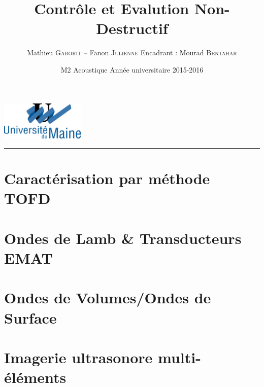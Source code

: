 \documentclass[a4paper, 10pt, twocolumn]{report}
\title{Contrôle et Evalution Non-Destructif}
\author{Mathieu \textsc{Gaborit} -- Fanon \textsc{Julienne} \hfill Encadrant : Mourad \textsc{Bentahar}}
\date{M2 Acoustique
    \vskip 1cm
    Année universitaire 2015-2016}
\makeatletter
\def\thetitle{\@title}
\def\theauthor{\@author}
\def\thedate{\@date}
\makeatother
\begin{document}
\begin{titlepage}

\begin{flushright}
\includegraphics[width=4cm]{logo.png}
\end{flushright}


\vskip 6cm


\vfill

\begin{center}
\Large{
\thedate
}
\end{center}

\vskip 1cm
\hrule height .5pt
\vskip 1cm

\begin{flushleft}
\theauthor
\end{flushleft}

\end{titlepage}


\renewcommand{\contentsname}{Sommaire
\vskip .5cm
\hrule height .5pt}
\tableofcontents

\newpage

\onecolumn


\twocolumn
\newpage
\part{Caractérisation par méthode TOFD}
\setcounter{section}{0}


\part{Ondes de Lamb \& Transducteurs EMAT}
\setcounter{section}{0}


\part{Ondes de Volumes/Ondes de Surface}
\setcounter{section}{0}


\part{Imagerie ultrasonore multi-éléments}
\setcounter{section}{0}



\newpage
\printbibliography

%
\end{document}
